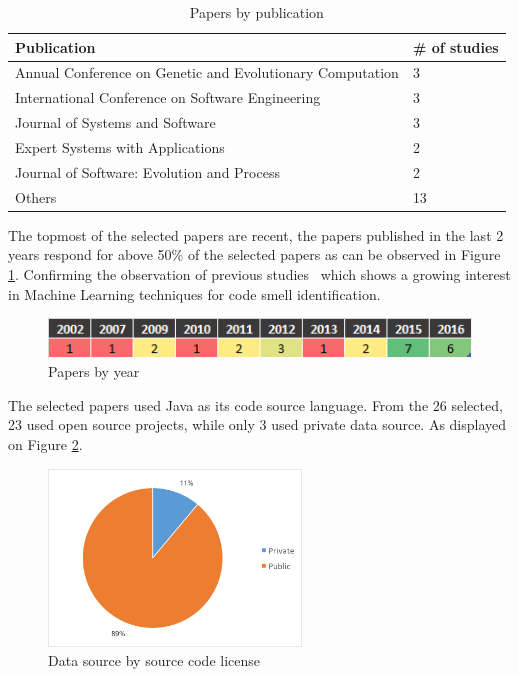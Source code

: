 \begin{table}[hbt]
\centering
\caption{Papers by publication}
\label{tab:papersByPublication}
\begin{tabular}{ll}
\hline
Publication &                                               \# of studies\\ \hline
Annual Conference on Genetic and Evolutionary Computation &     3   \\
International Conference on Software Engineering &              3   \\
Journal of Systems and Software &                               3   \\
Expert Systems with Applications &                              2   \\
Journal of Software: Evolution and Process &                    2   \\
Others &                                                        13  \\ \hline
\end{tabular}
\end{table}

The topmost of the selected papers are recent, the papers published in the last 2 years respond for above 50\% of the selected papers as can be observed in Figure \ref{fig:papersByYear}. Confirming the observation of previous studies~\citep{rasool2015review, fontana2016comparing} which shows a growing interest in Machine Learning techniques for code smell identification.

\begin{figure}[hbt] 
    \centering
	\caption{Papers by year}
	\label{fig:papersByYear}
	\includegraphics[]{imagens/papersByYear.png}
\end{figure}

The selected papers used Java as its code source language. From the 26 selected, 23 used open source projects, while only 3 used private data source. As displayed on Figure \ref{fig:StudiesBySourceDisponibility}.

\begin{figure}[hbt] 
    \centering
	\caption{Data source by source code license}
	\label{fig:StudiesBySourceDisponibility}
	\includegraphics[width=0.6\textwidth]{imagens/StudiesBySourceDisponibility.png}
\end{figure}

